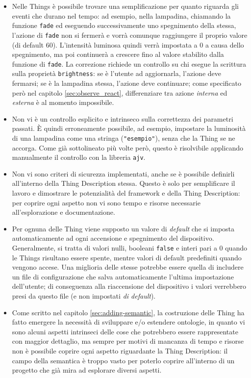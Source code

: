 \documentclass[12pt,a4paper,openright,oneside]{report}
\begin{document}
\begin{itemize}
	\item Nelle Things è possibile trovare una semplificazione per quanto riguarda gli eventi che durano nel tempo: ad esempio, nella lampadina, chiamando la funzione \texttt{fade} ed eseguendo successivamente uno spegnimento della stessa, l'azione di \texttt{fade} non si fermerà e vorrà comunque raggiungere il proprio valore (di default 60). L'intensità luminosa quindi verrà impostata a 0 a causa dello spegnimento, ma poi continuerà a crescere fino al valore stabilito dalla funzione di \texttt{fade}. La correzione richiede un controllo su chi esegue la scrittura sulla proprietà \texttt{brightness}: se è l'utente ad aggiornarla, l'azione deve fermarsi; se è la lampadina stessa, l'azione deve continuare;  
	come specificato però nel capitolo \ref{sec:observe_react}, differenziare tra azione \textit{interna} ed \textit{esterna} è al momento impossibile.
	
	\item Non vi è un controllo esplicito e intrinseco sulla correttezza dei parametri passati. È quindi erroneamente possibile, ad esempio, impostare la luminosità di una lampadina come una stringa (\texttt{"esempio"}), senza che la Thing se ne accorga. Come già sottolineato più volte però, questo è risolvibile applicando manualmente il controllo con la libreria \texttt{ajv}.
	
	\item Non vi sono criteri di sicurezza implementati, anche se è possibile definirli all'interno della Thing Description stessa. Questo è solo per semplificare il lavoro e dimostrare le potenzialità del framework e della Thing Description: per coprire ogni aspetto non vi sono tempo e risorse necessarie all'esplorazione e documentazione.
	
	\item Per ognuna delle Thing viene supposto un valore di \textit{default} che si imposta automaticamente ad ogni accensione e spegnimento del dispositivo. Generalmente, si tratta di valori nulli, booleani \texttt{false} e interi pari a 0 quando le Things risultano essere spente, mentre valori di default predefiniti quando vengono accese. Una miglioria delle stesse potrebbe essere quella di includere un file di configurazione che salva automaticamente l'ultima impostazione dell'utente; di conseguenza alla riaccensione del dispositivo i valori verrebbero presi da questo file (e non impostati \textit{di default}).
	
	\item Come scritto nel capitolo \ref{sec:adding-semantic}, la costruzione delle Thing ha fatto emergere la necessità di sviluppare e/o estendere ontologie, in quanto vi sono alcuni aspetti intrinseci delle cose che potrebbero essere rappresentate con maggior dettaglio, ma sempre per motivi di mancanza di tempo e risorse non è possibile coprire ogni aspetto riguardante la Thing Description: il campo della semantica è troppo vasto per poterlo coprire all'interno di un progetto che già mira ad esplorare diversi aspetti.
\end{itemize} 
\end{document}
